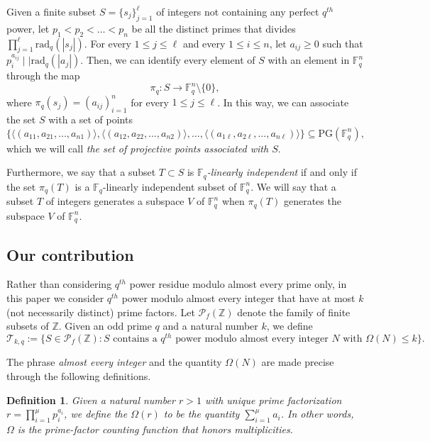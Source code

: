 \documentclass[12pt]{amsart}
\newtheorem{definition}{Definition}
\newcommand{\PG}{\mathrm{PG}}
\begin{document}
Given a finite subset $S = \{s_{j}\}_{j=1}^{\ell}$ of integers not containing any perfect $q^{th}$ power, let $p_{1} < p_{2} < \ldots < p_{n}$ be all the distinct primes that divides $\prod_{j=1}^{\ell}\text{rad}_{q}(|s_{j}|)$. For every $1 \leq j \leq \ell$ and every $1 \leq i \leq n$, let $a_{ij} \geq 0$ such that $p_{i}^{a_{ij}} \mid\mid \text{rad}_{q}(|a_{j}|)$. Then, we can identify every element of $S$ with an element in $\mathbb{F}_{q}^{n}$ through the map \[ \pi_{q} : S \longrightarrow  \mathbb{F}_{q}^{n}\setminus\{0\}, \] where $\pi_{q}(s_{j}) = \left( a_{ij} \right)_{i=1}^{n}$ for every $ 1 \leq j \leq \ell$. In this way, we can associate the set $S$ with a set of points \[ \Big\{ \langle (a_{11}, a_{21}, \ldots, a_{n1} )\rangle, \langle (a_{12}, a_{22}, \ldots, a_{n2} )\rangle, \ldots, \langle (a_{1\ell}, a_{2\ell}, \ldots, a_{n\ell} )\rangle \Big\} \subseteq\PG(\mathbb{F}_{q}^{n}), \] which we will call \textit{the set of projective points associated with $S$}.  

Furthermore, we say that a subset $T \subset S$ is \textit{$\mathbb{F}_{q}$-linearly independent} if and only if the set $\pi_{q}(T)$ is a $\mathbb{F}_{q}$-linearly independent subset of $\mathbb{F}_{q}^{n}$. We will say that a subset $T$ of integers generates a subspace $V$ of $\mathbb{F}_{q}^{n}$ when $\pi_{q}(T)$ generates the subspace $V$ of $\mathbb{F}_{q}^{n}$. 
 

\subsection{Our contribution}
Rather than considering $q^{th}$ power residue modulo almost every prime only, in this paper we consider $q^{th}$ power modulo almost every integer that have at most $k$ (not necessarily distinct) prime factors. Let $\mathcal{P}_{f}(\mathbb{Z})$ denote the family of finite subsets of $\mathbb{Z}$. Given an odd prime $q$ and a natural number $k$, we define
\[ \mathcal{T}_{k, q} := \Big\{ S \in\mathcal{P}_{f}(\mathbb{Z}) : S \text{ contains a $q^{th}$ power modulo almost every integer $N$ with } \Omega(N) \leq k \Big\}. \]


The phrase \textit{almost every integer} and the quantity $\Omega(N)$ are made precise through the following definitions. 

\begin{definition}
Given a natural number $r > 1$ with unique prime factorization $r = \prod_{i=1}^{\mu} p_{i}^{a_{i}} $, we define the $\Omega(r)$ to be the quantity $\sum_{i=1}^{\mu} a_{i}$. In other words, $\Omega$ is the prime-factor counting function that honors multiplicities.
\end{definition}
\end{document}
